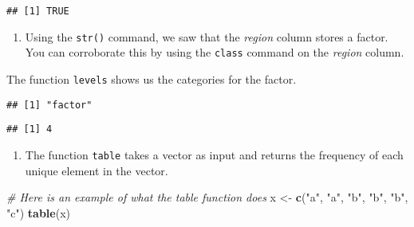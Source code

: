 \documentclass[
]{article}
\newenvironment{Shaded}{\begin{snugshade}}{\end{snugshade}}
\newcommand{\CommentTok}[1]{\textcolor[rgb]{0.56,0.35,0.01}{\textit{#1}}}
\newcommand{\KeywordTok}[1]{\textcolor[rgb]{0.13,0.29,0.53}{\textbf{#1}}}
\newcommand{\NormalTok}[1]{#1}
\newcommand{\OperatorTok}[1]{\textcolor[rgb]{0.81,0.36,0.00}{\textbf{#1}}}
\newcommand{\StringTok}[1]{\textcolor[rgb]{0.31,0.60,0.02}{#1}}
\providecommand{\tightlist}{%
  \setlength{\itemsep}{0pt}\setlength{\parskip}{0pt}}
\begin{document}
\begin{verbatim}
## [1] TRUE
\end{verbatim}

\begin{enumerate}
\def\labelenumi{\arabic{enumi}.}
\setcounter{enumi}{4}
\tightlist
\item
  Using the \texttt{str()} command, we saw that the \emph{region} column
  stores a factor. You can corroborate this by using the \texttt{class}
  command on the \emph{region} column.
\end{enumerate}

The function \texttt{levels} shows us the categories for the factor.

\begin{Shaded}
\end{Shaded}

\begin{verbatim}
## [1] "factor"
\end{verbatim}

\begin{Shaded}
\end{Shaded}

\begin{verbatim}
## [1] 4
\end{verbatim}

\begin{enumerate}
\def\labelenumi{\arabic{enumi}.}
\setcounter{enumi}{5}
\tightlist
\item
  The function \texttt{table} takes a vector as input and returns the
  frequency of each unique element in the vector.
\end{enumerate}

\begin{Shaded}
\begin{Highlighting}[]
\CommentTok{# Here is an example of what the table function does}
\NormalTok{x <-}\StringTok{ }\KeywordTok{c}\NormalTok{(}\StringTok{"a"}\NormalTok{, }\StringTok{"a"}\NormalTok{, }\StringTok{"b"}\NormalTok{, }\StringTok{"b"}\NormalTok{, }\StringTok{"b"}\NormalTok{, }\StringTok{"c"}\NormalTok{)}
\KeywordTok{table}\NormalTok{(x)}
\end{Highlighting}
\end{Shaded}
\end{document}
